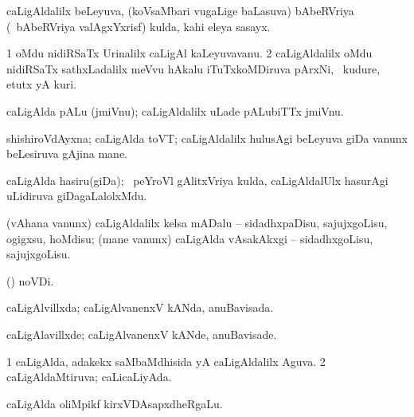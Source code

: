 {{{{{{\bentry
{}
 \gl{\nA}\bmng
caLigAldalilx beLeyuva, (koVsaMbari \mo vugaLige baLasuva) bAbeRVriya (\kanmu\ bAbeRVriya valAgxYxrisf) kulda, kahi eleya sasayx. 
\emng
\eentry

\bentry
{}
  \gl{\nA}\bmng
\bnum
\num{1} oMdu nidiRSaTx Urinalilx caLigAl kaLeyuvavanu. 
\num{2} caLigAldalilx oMdu nidiRSaTx sathxLadalilx meVvu hAkalu iTuTxkoMDiruva pArxNi, \kanmu\ kudure, etutx yA kuri. 
\enum
\emng
\eentry

\bentry
{}
  \gl{\nA}\bmng
caLigAlda pALu (jmiVnu); caLigAldalilx uLade pALubiTTx jmiVnu. 
\emng
\eentry

\bentry
{}
 \gl{\nA}\bmng
shishiroVdAyxna; caLigAlda toVT; caLigAldalilx hulusAgi beLeyuva giDa \mo vanunx beLesiruva gAjina mane. 
\emng
\eentry

\bentry
{}
  \gl{\nA}\bmng
caLigAlda hasiru(giDa); \kanmu\ peYroVl gAlitxVriya kulda, caLigAldalUlx hasurAgi uLidiruva giDagaLalolxMdu. 
\emng
\eentry

\bentry
{}
  \gl{\sakirx}\bmng
{} 
\emng
\eentry

\bentry
{}
  \gl{\sakirx}\bmng
(vAhana \mo vanunx) caLigAldalilx kelsa mADalu -- sidadhxpaDisu, sajujxgoLisu, ogigxsu, hoMdisu; (mane \mo vanunx) caLigAlda vAsakAkxgi -- sidadhxgoLisu, sajujxgoLisu. 
\emng
\eentry

\bentry
{}
 \gl{\nA}\bmng
{} (\pagu) noVDi. 
\emng
\eentry

\bentry
{}
  \gl{\gu}\bmng
caLigAlvillxda; caLigAlvanenxV kANda, anuBavisada. 
\emng
\eentry

\bentry
{}
  \gl{\kirxvi}\bmng
caLigAlavillxde; caLigAlvanenxV kANde, anuBavisade. 
\emng
\eentry

\bentry
{}
  \gl{\gu}\bmng
\bnum
\num{1} caLigAlda, adakekx saMbaMdhisida yA caLigAldalilx Aguva. 
\num{2} caLigAldaMtiruva; caLicaLiyAda. 
\enum
\emng
\eentry

\bentry
{}
 \gl{\nA}\bmng
caLigAlda oliMpikf kirxVDAsapxdheRgaLu. 
\emng
\eentry

}}}}}}
